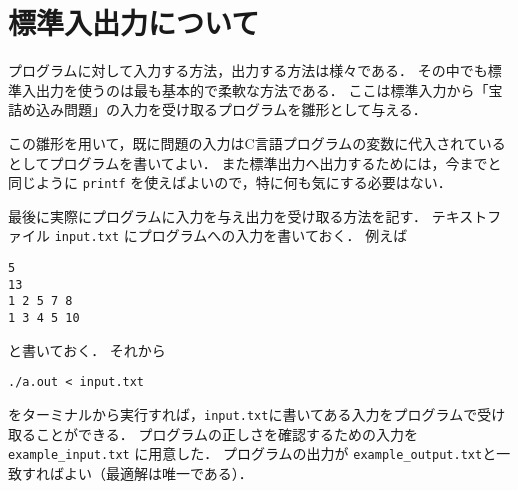 \documentclass[a4paper,twoside,onecolumn,openany,article]{memoir}
\theoremstyle{remark}
\begin{document}
\section{標準入出力について}
プログラムに対して入力する方法，出力する方法は様々である．
その中でも標準入出力を使うのは最も基本的で柔軟な方法である．
ここは標準入力から「宝詰め込み問題」の入力を受け取るプログラムを雛形として与える．


この雛形を用いて，既に問題の入力はC言語プログラムの変数に代入されているとしてプログラムを書いてよい．
また標準出力へ出力するためには，今までと同じように \texttt{printf} を使えばよいので，特に何も気にする必要はない．

最後に実際にプログラムに入力を与え出力を受け取る方法を記す．
テキストファイル \texttt{input.txt} にプログラムへの入力を書いておく．
例えば
\begin{verbatim}
5
13
1 2 5 7 8
1 3 4 5 10
\end{verbatim}
と書いておく．
それから

\begin{verbatim}
./a.out < input.txt
\end{verbatim}
をターミナルから実行すれば，\texttt{input.txt}に書いてある入力をプログラムで受け取ることができる．
プログラムの正しさを確認するための入力を \texttt{example\_input.txt} に用意した．
プログラムの出力が \texttt{example\_output.txt}と一致すればよい（最適解は唯一である）．
\end{document}
